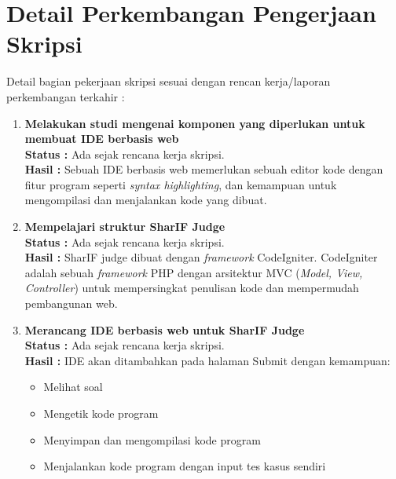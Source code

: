 \documentclass[a4paper,twoside]{article}
\begin{document}
\section{Detail Perkembangan Pengerjaan Skripsi}
Detail bagian pekerjaan skripsi sesuai dengan rencan kerja/laporan perkembangan terkahir :
	\begin{enumerate}
		\item \textbf{Melakukan studi mengenai komponen yang diperlukan untuk membuat IDE berbasis web}\\
		{\bf Status :} Ada sejak rencana kerja skripsi.\\
		{\bf Hasil :} Sebuah IDE berbasis web memerlukan sebuah editor kode dengan fitur program seperti \textit{syntax highlighting}, dan kemampuan untuk mengompilasi dan menjalankan kode yang dibuat.
		
		\item \textbf{Mempelajari struktur SharIF Judge}\\
		{\bf Status :} Ada sejak rencana kerja skripsi.\\
		{\bf Hasil :} SharIF judge dibuat dengan \textit{framework} CodeIgniter. CodeIgniter adalah sebuah \textit{framework} PHP dengan arsitektur MVC (\textit{Model, View, Controller}) untuk mempersingkat penulisan kode dan mempermudah pembangunan web.

		\item \textbf{Merancang IDE berbasis web untuk SharIF Judge}\\
		{\bf Status :} Ada sejak rencana kerja skripsi.\\
		{\bf Hasil :} IDE akan ditambahkan pada halaman Submit dengan kemampuan:
		\begin{itemize}
			\item Melihat soal
			\item Mengetik kode program
			\item Menyimpan dan mengompilasi kode program
			\item Menjalankan kode program dengan input tes kasus sendiri
		\end{itemize}
		

\end{enumerate}
\end{document}
